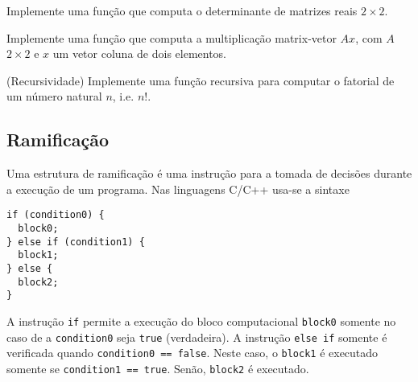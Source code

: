 \documentclass[12pt]{article}
\begin{document}
\begin{exr}
  Implemente uma função que computa o determinante de matrizes reais $2\times 2$. 
\end{exr}

\begin{exr}
  Implemente uma função que computa a multiplicação matrix-vetor $Ax$, com $A$ $2\times 2$ e $x$ um vetor coluna de dois elementos.
\end{exr}

\begin{exr}(Recursividade) Implemente uma função recursiva para computar o fatorial de um número natural $n$, i.e. $n!$.  
\end{exr}

\subsection{Ramificação}

Uma estrutura de ramificação é uma instrução para a tomada de decisões durante a execução de um programa. Nas linguagens C/C++ usa-se a sintaxe
\begin{lstlisting}
if (condition0) {
  block0;
} else if (condition1) {
  block1;
} else {
  block2;
}
\end{lstlisting}
A instrução \lstinline+if+ permite a execução do bloco computacional \lstinline+block0+ somente no caso de a \lstinline+condition0+ seja \lstinline+true+ (verdadeira). A instrução \lstinline+else if+ somente é verificada quando \lstinline+condition0 == false+. Neste caso, o \lstinline+block1+ é executado somente se \lstinline+condition1 == true+. Senão, \lstinline+block2+ é executado.
\end{document}
